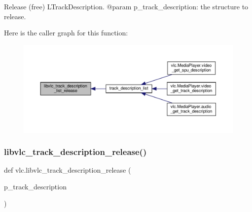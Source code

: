 \begin{DoxyVerb}Release (free) L{TrackDescription}.
@param p_track_description: the structure to release.
\end{DoxyVerb}
 Here is the caller graph for this function\+:
\nopagebreak
\begin{figure}[H]
\begin{center}
\leavevmode
\includegraphics[width=350pt]{namespacevlc_a15a83a58b01dc7546ad799fffe743a93_icgraph}
\end{center}
\end{figure}
\mbox{\label{namespacevlc_a7f44252e965f874e76b3c2f7a831d88d}} 
\subsubsection{\texorpdfstring{libvlc\+\_\+track\+\_\+description\+\_\+release()}{libvlc\_track\_description\_release()}}
{\footnotesize\ttfamily def vlc.\+libvlc\+\_\+track\+\_\+description\+\_\+release (\begin{DoxyParamCaption}\item[{}]{p\+\_\+track\+\_\+description }\end{DoxyParamCaption})}

